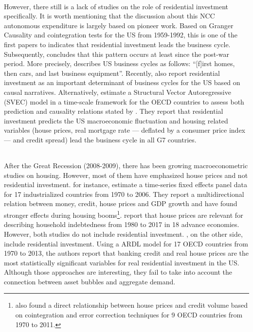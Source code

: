 \documentclass[12pt]{article}
\begin{document}
\\
However, there still is a lack of studies on the role of residential investment specifically.
It is worth mentioning that the discussion about this NCC autonomous expenditure is largely based on \textcite{green_follow_1997} pioneer work.
Based on Granger Causality and cointegration tests for the US from 1959-1992, this is one of the first papers to indicates that residential investment leads the business cycle.
Subsequently, \textcite{leamer_housing_2007} concludes that this pattern occurs at least since the post-war period.
More precisely,  \textcite[p.~8]{leamer_housing_2007} describes US business cycles as follows: ``[f]irst homes, then cars,
and last business equipment''.
Recently, \textcites{fiebiger_semi-autonomous_2018}{fiebiger_trend_2017} also report residential investment as an important determinant of business cycles for the US based on causal narratives.
Alternatively, \textcite{huang_is_2020} estimate a Structural Vector Autoregressive (SVEC) model in a time-scale framework for the OECD countries to assess both prediction and causality relations stated by \textcite{leamer_housing_2007}.
They report that residential investment predicts the US  macroeconomic fluctuation and housing related variables (house prices, real mortgage rate --- deflated by a consumer price index --- and credit spread) lead the business cycle in all G7 countries.

\\
After the Great Recession (2008-2009), there has been growing macroeconometric studies on housing.
However, most of them have emphasized house prices and not residential investment.
\textcite{goodhart_house_2008} for instance, estimate a time-series fixed effects panel data for 17 industrialized countries from 1970 to 2006. They report a multidirectional relation between money, credit, house prices and GDP growth and have found stronger effects during housing booms\footnote{\textcite{Arestis_Bank_2014} also found a  direct relationship between house prices and credit volume based on cointegration and error correction techniques for 9 OECD countries from 1970 to 2011.}. 
\textcite{wood_house_2020} report that house prices are relevant for describing household indebtedness from 1980 to 2017 in 18 advance economies.
However, both studies do not include residential investment.
\textcite{Arestis_Residential_2014}, on the other side, include residential investment. Using a ARDL model for 17 OECD countries from 1970 to 2013, the authors report that banking credit and real house prices are the most statistically significant variables for real residential investment in the US.
Although those approaches are interesting, they fail to take into account the connection between asset bubbles and aggregate demand.
\end{document}
